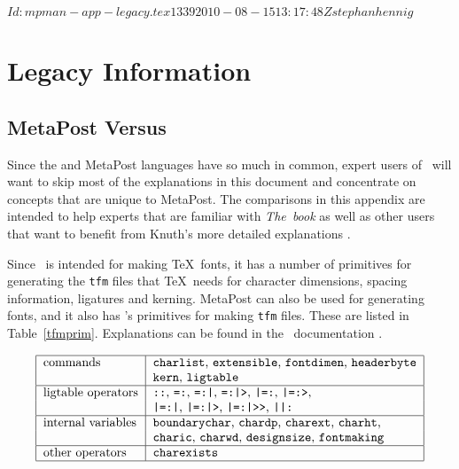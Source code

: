 \svnInfo $Id: mpman-app-legacy.tex 1339 2010-08-15 13:17:48Z stephanhennig $
\section{Legacy Information}
\label{legacy}

\subsection{MetaPost Versus \MF}
\label{MPvsMF}

Since the \MF{} and MetaPost languages have so much in
common, expert users of \MF\ will want to skip most of the explanations
in this document and concentrate on concepts that are unique to
MetaPost.  The comparisons in this appendix are intended to help experts
that are familiar with {\sl The\ \MF book} as well as other users that
want to benefit from Knuth's more detailed explanations \cite{kn:c}.

Since \MF\ is intended for making \TeX\ fonts, it has a number of
primitives for generating the {\tt tfm} files that \TeX\ needs for character
dimensions, spacing information, ligatures and
kerning.  MetaPost can also be used for generating fonts,
and it also has \MF's primitives for making {\tt tfm} files.  These are
listed in Table~\ref{tfmprim}.  Explanations can be found in the \MF\
documentation \cite{kn:c,kn:mf3}.

\begin{table}[htp]
$$\begin{tabular}{|l|l|}  \hline
commands&               {\tt charlist}, {\tt extensible},
                        {\tt fontdimen}, {\tt headerbyte}               \\
        &               {\tt kern}, {\tt ligtable}                      \\ \hline
ligtable operators&     \verb!::!, \verb!=:!, \verb!=:|!, \verb!=:|>!,
                        \verb!|=:!, \verb!|=:>!,                        \\
        &               \verb!|=:|!, \verb!|=:|>!, \verb!|=:|>>!,
                        \verb!||:!                                      \\ \hline
internal variables\index{internal variables}\index{variables!internal}&
                        {\tt boundarychar}, {\tt chardp},
                        {\tt charext}, {\tt charht},                    \\
        &               {\tt charic}, {\tt charwd},
                        {\tt designsize}, {\tt fontmaking}              \\ \hline
other operators&        {\tt charexists}                                \\ \hline
\end{tabular}
$$
\caption{MetaPost primitives for making {\tt tfm} files.}
\label{tfmprim}
\end{table}

